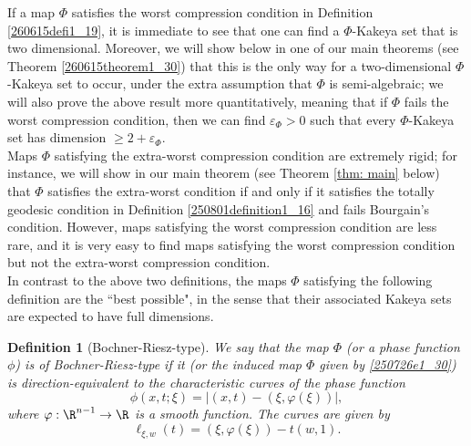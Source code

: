 \documentclass{article}
\numberwithin{equation}{section}
\theoremstyle{plain}
\newtheorem{definition}[theorem]{Definition}
\begin{document}
If a map $\Phi$ satisfies the worst compression condition in Definition \ref{260615defi1_19}, it is immediate to see that one can find a $\Phi$-Kakeya set that is two dimensional. Moreover, we will show below in one of our main theorems (see Theorem \ref{260615theorem1_30}) that 
this is the only way for a two-dimensional $\Phi$-Kakeya set to occur, under the extra assumption that $\Phi$ is semi-algebraic; we will also prove the above result more quantitatively, meaning that if $\Phi$ fails the worst compression condition, then we can find $\varepsilon_{\Phi}>0$ such that every $\Phi$-Kakeya set has dimension $\ge 2+\varepsilon_{\Phi}$. \\





Maps $\Phi$ satisfying the extra-worst compression condition are extremely rigid; for instance, we will show in our main theorem (see Theorem \ref{thm: main} below) that $\Phi$ satisfies the extra-worst condition if and only if it satisfies the totally geodesic condition in Definition \ref{250801definition1_16} and fails Bourgain's condition. However, maps satisfying the worst compression condition are less rare, and it is very easy to find maps satisfying the worst compression condition but not the extra-worst compression condition. \\












In contrast to the above two definitions, the maps $\Phi$ satisfying the following definition are the ``best possible", in the sense that their associated Kakeya sets are expected to have full dimensions. 



\begin{definition}[Bochner-Riesz-type]
 We say that the map $\Phi$ (or a phase function $\phi$) is of Bochner-Riesz-type if it (or the induced map $\Phi$ given by \eqref{250726e1_30}) is direction-equivalent to the characteristic curves of the phase function 
 \begin{equation}
 \phi(x, t; \xi) = |(x, t) - (\xi, \varphi(\xi))|,
 \end{equation}
  where $\varphi : \R^{n-1} \to \R$ is a smooth function. The curves are given by 
  \begin{equation}
  \ell_{\xi,w}(t) = (\xi, \varphi(\xi)) - t (w,1).
  \end{equation}
\end{definition}
\end{document}
